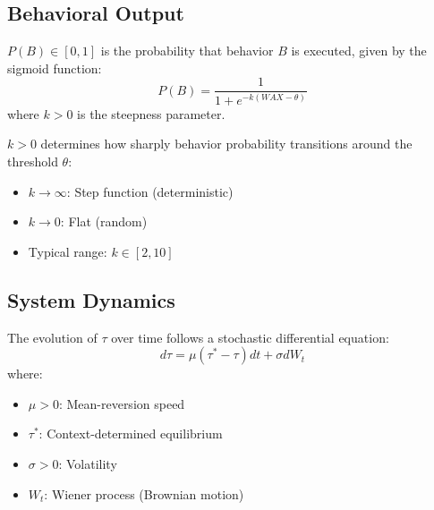 \subsection{Behavioral Output}

\begin{definition}
\label{def:prob-behavior}
$P(B) \in [0,1]$ is the probability that behavior $B$ is executed, given by the sigmoid function:
\begin{equation}
P(B) = \frac{1}{1 + e^{-k(WAX - \theta)}}
\end{equation}
where $k > 0$ is the steepness parameter.
\end{definition}

\begin{definition}
\label{def:steepness}
$k > 0$ determines how sharply behavior probability transitions around the threshold $\theta$:
\begin{itemize}
\item $k \rightarrow \infty$: Step function (deterministic)
\item $k \rightarrow 0$: Flat (random)
\item Typical range: $k \in [2, 10]$
\end{itemize}
\end{definition}


\subsection{System Dynamics}

\begin{definition}
\label{def:tau-dynamics}
The evolution of $\tau$ over time follows a stochastic differential equation:
\begin{equation}
d\tau = \mu(\tau^* - \tau)dt + \sigma dW_t
\end{equation}
where:
\begin{itemize}
\item $\mu > 0$: Mean-reversion speed
\item $\tau^*$: Context-determined equilibrium
\item $\sigma > 0$: Volatility
\item $W_t$: Wiener process (Brownian motion)
\end{itemize}
\end{definition}

